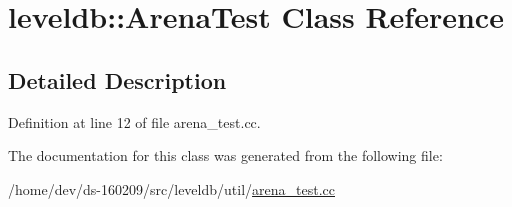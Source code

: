 \hypertarget{classleveldb_1_1_arena_test}{}\section{leveldb\+:\+:Arena\+Test Class Reference}
\label{classleveldb_1_1_arena_test}


\subsection{Detailed Description}


Definition at line 12 of file arena\+\_\+test.\+cc.



The documentation for this class was generated from the following file\+:\begin{DoxyCompactItemize}
\item 
/home/dev/ds-\/160209/src/leveldb/util/\hyperlink{arena__test_8cc}{arena\+\_\+test.\+cc}\end{DoxyCompactItemize}
